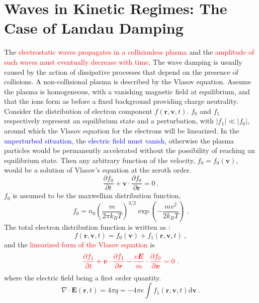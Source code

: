 \documentclass[12pt,a4paper]{article}
\renewcommand{\vec}[1]{\boldsymbol{#1}}
\newcommand{\dif}{\mathrm{d}}
\begin{document}
\section{Waves in Kinetic Regimes: The Case of Landau Damping}
\cite{2015bps..book.....C} The \textcolor{red}{electrostatic waves propagates in a collisionless plasma} and the \textcolor{red}{amplitude of such waves must eventually decrease with time}. The wave damping is usually caused by the action of dissipative processes that depend on the presence of collisions. A non-collisional plasma is described by the Vlasov equation. Assume the plasma is homogeneous, with a vanishing magnetic field at equilibrium, and that the ions form as before a fixed background providing charge neutrality. Consider the distribution of electron component $f(\vec{r}, \vec{v}, t)$. $f_0$ and $f_1$ respectively represent an equilibrium state and a perturbation, with $|f_1| \ll |f_0|$, around which the Vlasov equation for the electrons will be linearized. In the \textcolor{blue}{unperturbed situation}, the \textcolor{blue}{electric field must vanish}, otherwise the plasma particles would be permanently accelerated without the possibility of reaching an equilibrium state. Then any arbitrary function of the velocity, $f_0 = f_0(\vec{v})$, would be a solution of Vlasov’s equation at the zeroth order.
\begin{equation*}
\frac{\partial f_0}{\partial t} +\vec{v} \cdot \frac{\partial f_0}{\partial \vec{r} } = 0 ~.
\end{equation*}
$f_0$ is assumed to be the maxwellian distribution function,
\begin{equation*}
f_0 = n_0 \left(\frac{m}{2\pi k_B T} \right)^{3/2} \exp \left(-\frac{m v^2}{2k_B T}  \right) ~.
\end{equation*}
The total electron distribution function is written as :
\begin{equation*}
f(\vec{r}, \vec{v}, t) = f_0(\vec{v}) +f_1(\vec{r}, \vec{v}, t) ~,
\end{equation*}
and the \textcolor{red}{linearized form of the Vlasov equation} is
\begin{equation}
\color{red} \frac{\partial f_1}{\partial t} +\vec{v} \cdot \frac{\partial f_1}{\partial \vec{r} } -\frac{e \vec{E} }{m}\cdot \frac{\partial f_0}{\partial \vec{v}} = 0 ~.
\label{linear_equ}
\end{equation}
where the electric field being a first order quantity.
\begin{equation}
\nabla \cdot \vec{E}(\vec{r}, t) = 4\pi q = -4\pi e \int f_1(\vec{r}, \vec{v}, t) \dif \vec{v} ~.
\end{equation}
\end{document}
